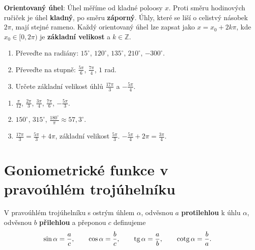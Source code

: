 \begin{definitionbox}
  \textbf{Orientovaný úhel}: Úhel měříme od kladné poloosy $x$. Proti směru hodinových ručiček je úhel \textbf{kladný}, po směru \textbf{záporný}. Úhly, které se liší o celistvý násobek $2\pi$, mají stejné rameno. Každý orientovaný úhel lze zapsat jako $x = x_0 + 2k\pi$, kde $x_0\in[0, 2\pi)$ je \textbf{základní velikost} a $k\in\mathbb{Z}$.
\end{definitionbox}

\begin{problem}
  \begin{enumerate}[label=(\alph*)]
    \item Převeďte na radiány: $15^\circ$, $120^\circ$, $135^\circ$, $210^\circ$, $-300^\circ$.
    \item Převeďte na stupně: $\frac{5\pi}{6}$, $\frac{7\pi}{4}$, $1$ rad.
    \item Určete základní velikost úhlů $\frac{17\pi}{3}$ a $-\frac{5\pi}{4}$.
  \end{enumerate}
\end{problem}

\begin{solution}
  \begin{enumerate}[label=(\alph*)]
    \item $\frac{\pi}{12}$, $\frac{2\pi}{3}$, $\frac{3\pi}{4}$, $\frac{7\pi}{6}$, $-\frac{5\pi}{3}$.
    \item $150^\circ$, $315^\circ$, $\frac{180^\circ}{\pi}\approx 57{,}3^\circ$.
    \item $\frac{17\pi}{3} = \frac{5\pi}{3} + 4\pi$, základní velikost $\frac{5\pi}{3}$. $-\frac{5\pi}{4} + 2\pi = \frac{3\pi}{4}$.
  \end{enumerate}
\end{solution}

\section{Goniometrické funkce v pravoúhlém trojúhelníku}\label{sec:gon-pravouhly}

\begin{definitionbox}
  V pravoúhlém trojúhelníku s ostrým úhlem $\alpha$, odvěsnou $a$ \textbf{protilehlou} k úhlu $\alpha$, odvěsnou $b$ \textbf{přilehlou} a přeponou $c$ definujeme
  \begin{equation*}
    \sin\alpha = \frac{a}{c},\qquad\cos\alpha = \frac{b}{c},\qquad\operatorname{tg}\alpha = \frac{a}{b},\qquad\operatorname{cotg}\alpha = \frac{b}{a}.
  \end{equation*}
\end{definitionbox}

